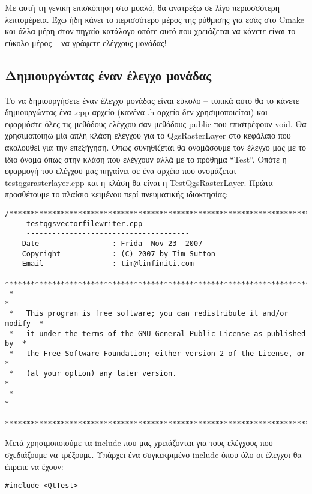 Με αυτή τη γενική επισκόπηση στο μυαλό, θα ανατρέξω σε λίγο περιοσσότερη λεπτομέρεια. Έχω ήδη κάνει το περισσότερο μέρος της ρύθμισης για εσάς στο Cmake και άλλα μέρη στον πηγαίο κατάλογο οπότε αυτό που χρειάζεται να κάνετε είναι το εύκολο μέρος – να γράφετε ελέγχους μονάδας!

\hypertarget{toc49}{}
\subsection{Δημιουργώντας έναν έλεγχο μονάδας}
Το να δημιουργήσετε έναν έλεγχο μονάδας είναι εύκολο – τυπικά αυτό θα το κάνετε δημιουργώντας ένα .cpp αρχείο (κανένα .h αρχείο δεν χρησιμοποιείται) και εφαρμόστε όλες τις μεθόδους ελέγχου σαν μεθόδους public που επιστρέφουν void. Θα χρησιμοποιηω μία απλή κλάση ελέγχου για το QgsRasterLayer στο κεφάλαιο που ακολουθεί για την επεξήγηση. Όπως συνηθίζεται θα ονομάσουμε τον έλεγχο μας με το ίδιο όνομα όπως στην κλάση που ελέγχουν αλλά με το πρόθημα “Test”. Οπότε η εφαρμογή του ελέγχου μας πηγαίνει σε ένα αρχέιο που ονομάζεται testqgsrasterlayer.cpp και η κλάση θα είναι η TestQgsRasterLayer.
 Πρώτα προσθέτουμε το πλαίσιο κειμένου περί πνευματικής ιδιοκτησίας:

\begin{verbatim}
/***************************************************************************
     testqgsvectorfilewriter.cpp
     --------------------------------------
    Date                 : Frida  Nov 23  2007
    Copyright            : (C) 2007 by Tim Sutton
    Email                : tim@linfiniti.com
 ***************************************************************************
 *                                                                         *
 *   This program is free software; you can redistribute it and/or modify  *
 *   it under the terms of the GNU General Public License as published by  *
 *   the Free Software Foundation; either version 2 of the License, or     *
 *   (at your option) any later version.                                   *
 *                                                                         *
 ***************************************************************************/
\end{verbatim}

Μετά χρησιμοποιούμε τα include που μας χρειάζονται για τους ελέγχους που σχεδιάζουμε να τρέξουμε. Υπάρχει ένα συγκεκριμένο include όπου όλο οι έλεγχοι θα έπρεπε να έχουν:

\begin{verbatim}
#include <QtTest>
\end{verbatim}

